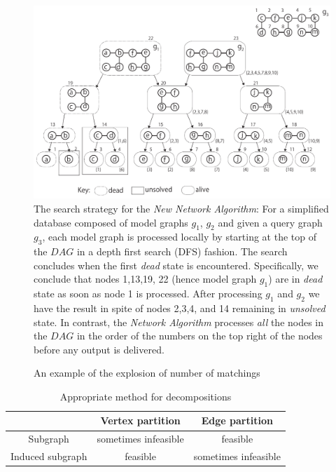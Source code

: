 \begin{figure}
\centering
\includegraphics[width=1.0\textwidth]{dag_search_optimize.pdf}
\caption{The search strategy for the \textit{New Network Algorithm}: For a simplified database composed of model graphs $g_1$, $g_2$ and  given a query graph $g_3$, each model graph is processed locally by starting at the top of the $DAG$ in a depth first search (DFS) fashion. 
The search concludes when the first \textit{dead} state is encountered. 
Specifically, we conclude that nodes 1,13,19, 22 (hence model graph $g_1$) are in \textit{dead} state as soon as node 1 is processed. 
After processing $g_1$ and $g_2$ we have the result in spite of nodes 2,3,4, and 14 remaining in \textit{unsolved} state. 
In contrast, the \textit{Network Algorithm} processes \textit{all} the nodes in the $DAG$ in the order of the numbers on the top right of the nodes before any output is delivered.}
\label{fig:fig3}
\end{figure}

\begin{figure}
        \centering
        
        \caption{An example of the explosion of number of matchings \label{fig:fig4} }
\end{figure}

\begin{table}
\begin{center}\begin{tabular}{|c|c|c|}
\hline
  & Vertex partition  & Edge partition  \\ \hline
Subgraph & sometimes infeasible  & feasible \\ \hline
Induced subgraph & feasible & sometimes  infeasible \\ \hline
\end{tabular}
\caption{Appropriate method for decompositions \label{tab:table1} }
\end{center}
\end{table}

